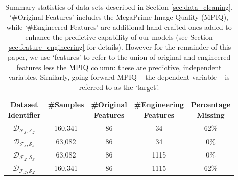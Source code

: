 \begin{enumerate}
\begin{table}
    \caption{Summary statistics of data sets described in Section \ref{sec:data_cleaning}. `\#Original Features' includes the MegaPrime Image Quality (MPIQ), while `\#Engineered Features' are additional hand-crafted ones added to enhance the predictive capability of our models (see Section \ref{sec:feature_engineering} for details). However for the remainder of this paper, we use `features' to refer to the union of original and engineered features less the MPIQ column: these are predictive, independent variables. Similarly, going forward MPIQ -- the dependent variable -- is referred to as the `target'.}
    \label{tab:datasets_overview}
    \centering
    \begin{tabular}{ccccc}
        \toprule
        \toprule
        \thead{Dataset \\ Identifier} & \#Samples & \thead{\#Original \\ Features} & \thead{\#Engineering \\ Features} & \thead{Percentage \\ Missing} \\ \midrule
        $\mathcal{D_{F_S,S_L}}$ & 160,341 & 86 & 34 & 62\% \\
        $\mathcal{D_{F_S,S_S}}$ & 63,082 & 86 & 34 & 0\% \\
        $\mathcal{D_{F_L,S_S}}$ & 63,082 & 86 & 1115 & 0\% \\
        $\mathcal{D_{F_L,S_L}}$ & 160,341 & 86 & 1115 & 62\% \\        
        \bottomrule
    \end{tabular}
\end{table}

\end{enumerate}

